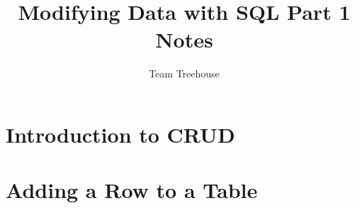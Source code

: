 \documentclass[12pt]{article}
\begin{document}
\title{Modifying Data with SQL Part 1 Notes}
\author{Team Treehouse}
\maketitle

\bigskip

\section{Introduction to CRUD}

\bigskip

\section{Adding a Row to a Table}

\bigskip
\end{document}
